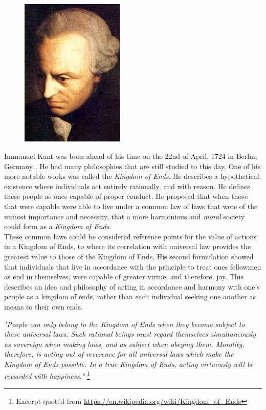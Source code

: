 \documentclass[11pt]{article}
\begin{document}
\begin{figure}
    \centering
    \includegraphics[width=0.44\textwidth]{kant.jpg}
\end{figure}
Immanuel Kant was born ahead of his time on the 22nd of April, 1724 in Berlin, Germany \cite{kant}. He had many philosophies that are still studied to this day. 
One of his more notable works was called the \textit{Kingdom of Ends}. 
He describes a hypothetical existence where individuals act entirely rationally, and with reason.
He defines these people as ones capable of proper conduct. 
He proposed that when those that were capable were able to live under a common law of laws that were of the utmost importance and necessity, that a more harmonious and \textit{moral} society could form as a \textit{Kingdom of Ends}.\\

\noindent These common laws could be considered reference points for the value of actions in a Kingdom of Ends, to where its correlation with universal law provides the greatest value to those of the Kingdom of Ends.
His second formulation showed that individuals that live in accordance with the principle to treat ones fellowmen as end in themselves, were capable of greater virtue, and therefore, joy.
This describes an idea and philosophy of acting in accordance and harmony with one's people as a kingdom of ends, rather than each individual seeking one another as means to their own ends.

\bigskip
\textit{"People can only belong to the Kingdom of Ends when they become subject to these universal laws. 
Such rational beings must regard themselves simultaneously as sovereign when making laws, and as subject when obeying them. 
Morality, therefore, is acting out of reverence for all universal laws which make the Kingdom of Ends possible. 
In a true Kingdom of Ends, acting virtuously will be rewarded with happiness."} \footnote{Excerpt quoted from \url{https://en.wikipedia.org/wiki/Kingdom_of_Ends}}
\end{document}

